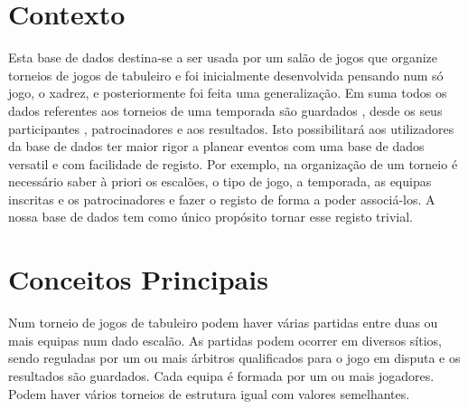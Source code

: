 \documentclass[a4paper]{article}
\begin{document}
\newpage






\section{Contexto}
Esta base de dados destina-se a ser usada por um salão de jogos que organize torneios de jogos de tabuleiro e foi inicialmente desenvolvida pensando num só jogo, o xadrez, e posteriormente foi feita uma generalização. Em suma todos os dados referentes aos torneios de uma temporada são guardados , desde os seus participantes , patrocinadores e aos resultados. Isto possibilitará aos utilizadores da base de dados ter maior rigor a planear eventos com uma base de dados versatil e com facilidade de registo. Por exemplo, na organização de um torneio é necessário saber à priori os escalões, o tipo de jogo, a temporada, as equipas inscritas e os patrocinadores e fazer o registo de forma a poder associá-los. A nossa base de dados tem como único propósito tornar esse registo trivial.

\section{Conceitos Principais}
Num torneio de jogos de tabuleiro podem haver várias partidas entre duas ou mais equipas num dado escalão. As partidas podem ocorrer em diversos sítios, sendo reguladas por um ou mais árbitros qualificados para o jogo em disputa e os resultados são guardados. Cada equipa é formada por um ou mais jogadores. Podem haver vários torneios de estrutura igual com valores semelhantes.

\end{document}
